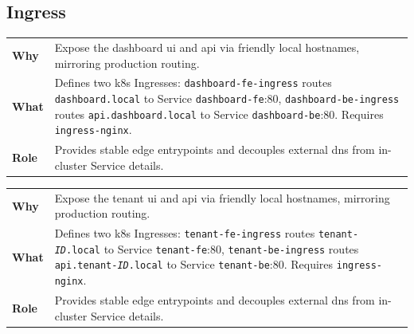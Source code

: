 \documentclass[11pt, a4paper, oneside, listof=totoc]{scrartcl}
\makeatletter
\newcommand{\codesummary}[3]{%
    \vspace{0.4\baselineskip}%
    \noindent\begin{tabularx}{\linewidth}{@{}>{\bfseries}l X@{}}
    Why  & #1\\
    What & #2\\
    Role & #3\\
    \end{tabularx}%
    \vspace{0.2\baselineskip}%
}
\makeatother
\begin{document}
        \clearpage     

            \subsection{Ingress}
                \codesummary
                    {Expose the dashboard \gls{ui} and \gls{api} via friendly local hostnames, mirroring production routing.}
                    {Defines two \gls{k8s} Ingresses: \texttt{dashboard-fe-ingress} routes \texttt{dashboard.local} to Service \texttt{dashboard-fe}:80, \texttt{dashboard-be-ingress} routes \texttt{api.dashboard.local} to Service \texttt{dashboard-be}:80. Requires \texttt{ingress-nginx}.}
                    {Provides stable edge entrypoints and decouples external \gls{dns} from in-cluster Service details.}

        \clearpage

                \codesummary
                    {Expose the tenant \gls{ui} and \gls{api} via friendly local hostnames, mirroring production routing.}
                    {Defines two \gls{k8s} Ingresses: \texttt{tenant-fe-ingress} routes \texttt{tenant-\textit{ID}.local} to Service \texttt{tenant-fe}:80, \texttt{tenant-be-ingress} routes \texttt{api.tenant-\textit{ID}.local} to Service \texttt{tenant-be}:80. Requires \texttt{ingress-nginx}.}
                    {Provides stable edge entrypoints and decouples external \gls{dns} from in-cluster Service details.}
\end{document}
